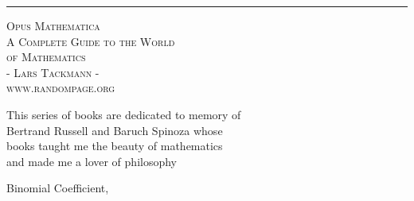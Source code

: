 \documentclass[ebook,9pt,twoside,final]{memoir}
\theoremstyle{definition}
\begin{document}
\begin{titlingpage}
\rule[5pt]{155mm}{0.3mm}
\vspace{3cm}
\begin{center}
	\Huge \textsc{Opus Mathematica\\}
	\vspace{2cm}
	\large \textsc{A Complete Guide to the World \\ of Mathematics\\}
	\vspace{10cm}
	\textsc{- Lars Tackmann -\\} \textsc{www.randompage.org}
\end{center}
\end{titlingpage}

\thispagestyle{empty}
\begin{flushright}
This series of books are dedicated to memory of \\ 
Bertrand Russell and Baruch Spinoza whose \\
books taught me the beauty of mathematics \\ 
and made me a lover of philosophy 
\end{flushright}

\frontmatter 
\tableofcontents*


\mainmatter 









\appendix

%

\backmatter
\begin{theindex}
\item Binomial Coefficient, \pageref{binom_2}
\end{theindex}
\end{document}
